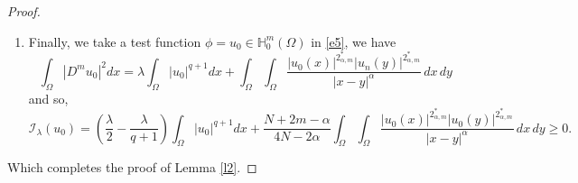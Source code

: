 \documentclass[reqno]{amsart}
\newcommand{\la} {\lambda}
\newcommand{\Om}{\Omega}
\newcommand{\weak}{\rightharpoonup}
\newcommand{\al} {\alpha}
\newcommand{\noi} {  \noindent}
\newcommand{\mb} {\mathbb}
\newcommand{\mc} {\mathcal}
\numberwithin{theorem}{section} \numberwithin{equation}{section}
\begin{document}
\begin{proof}
\begin{enumerate}
as $n\to\infty$, we obtain
\[(|x|^{-\al}*|u_n|^{2_{\al, m}^{*}})|u_n|^{2_{\al, m}^{*}-2}u_n \weak
(|x|^{-\al}*|u_0|^{2_{\al, m}^{*}})|u_0|^{2_{\al, m}^{*}-2}u_0 \text{ weakly in }  L^\frac{2N}{N+2}(\Om),\]\\
as $n\to\infty$. Since for any $\phi\in C_c^{\infty}(\Om)$,
\[0\leftarrow\langle \mc I_\la^{\prime}(u_n), \phi\rangle=\int_{\Om}D^{m}u_n D^{m}\phi dx -\la\int_{\Om}|u_n|^{q-2}u_n{\phi} dx-\int_{\Om}\int_{\Om} \frac{|u_n(y)|^{2_{\al, m}^{*}}|u_n(x)|^{2_{\al, m}^{*}-2}u_n(x){\phi(x)}}{|x-y|^{\al}} \, dx \, dy.\]\\
\noi Taking the limit as $n\to\infty$, we obtain
\[\int_{\Om}D^{m}u_0 D^{m}\phi dx -\la\int_{\Om}|u_0|^{q-2}u_{0}{\phi} dx-\int_{\Om}\int_{\Om} \frac{|u_0(y)|^{2_{\al, m}^{*}}|u_0(x)|^{2_{\al, m}^{*}-2}u_0(x){\phi(x)}}{|x-y|^{\al}} \, dx \, dy=0,\]\\
for any $\phi\in\mb{H}_0^{m}(\Om)$, which means $u_0$ is a weak solution of the problem \eqref{e5}.\\
\item Finally, we take a test function $\phi=u_0\in\mb{H}_0^{m}(\Om)$ in \eqref{e5}, we have
\[\int_{\Om}|D^{m}u_0|^2dx =\la\int_{\Om}|u_0|^{q+1} dx+\int_{\Om}\int_{\Om} \frac{|u_0(x)|^{2_{\al, m}^{*}}|u_n(y)|^{2_{\al, m}^{*}}}{|x-y|^{\al}} \, dx \, dy\]
and so,
\[\mc{I_\la}(u_0)=\left({\frac{\la}{2}}-{\frac{\la}{q+1}}\right)\int_{\Om}|u_0|^{q+1} dx + \frac{N+2m-\al}{4N-2\al}\int_{\Om}\int_{\Om} \frac{|u_0(x)|^{2_{\al, m}^{*}}|u_0(y)|^{2_{\al,m}^{*}}}{|x-y|^{\al}} \, dx \, dy\geq0.\]
\end{enumerate}
Which completes the proof of Lemma \ref{l2}.
\end{proof}
\end{document}
